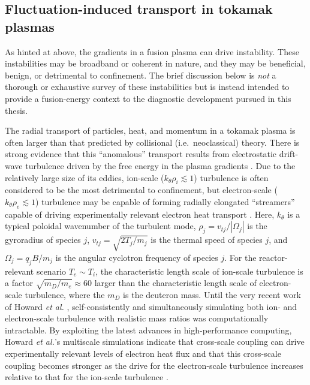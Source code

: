 \subsection{Fluctuation-induced transport in tokamak plasmas}
As hinted at above, the gradients in a fusion plasma can drive instability.
These instabilities may be broadband or coherent in nature, and
they may be beneficial, benign, or detrimental to confinement.
The brief discussion below is \emph{not}
a thorough or exhaustive survey of these instabilities but
is instead intended to provide a fusion-energy context
to the diagnostic development pursued in this thesis.

The radial transport of particles, heat, and momentum in a tokamak plasma is
often larger than that predicted by collisional (i.e.\ neoclassical) theory.
There is strong evidence that this ``anomalous'' transport
results from electrostatic drift-wave turbulence
driven by the free energy in the plasma gradients
\cite{horton_drift_waves,tynan_ppcf09}.
Due to the relatively large size of its eddies,
ion-scale ($k_{\theta} \rho_i \lesssim 1$) turbulence is often considered
to be the most detrimental to confinement, but
electron-scale ($k_{\theta} \rho_e \lesssim 1$) turbulence
may be capable of forming radially elongated ``streamers''
\cite{dorland_prl00}
capable of driving experimentally relevant electron heat transport
\cite{jenko_prl02}.
Here, $k_{\theta}$ is a typical poloidal wavenumber of the turbulent mode,
$\rho_j = v_{tj} / |\Omega_j|$ is the gyroradius of species $j$,
$v_{tj} = \sqrt{2 T_j / m_j}$ is the thermal speed of species $j$, and
$\Omega_j = q_j B / m_j$ is the angular cyclotron frequency of species $j$.
For the reactor-relevant scenario $T_e \sim T_i$,
the characteristic length scale of ion-scale turbulence is a factor
$\sqrt{m_D / m_e} \approx 60$ larger than
the characteristic length scale of electron-scale turbulence,
where the $m_D$ is the deuteron mass.
Until the very recent work of Howard \emph{et al.}
\cite{howard_pp14, howard_nf16, howard_pp16, holland_nf17, howard_ppcf18},
self-consistently and simultaneously simulating
both ion- and electron-scale turbulence with realistic mass ratios
was computationally intractable.
By exploiting the latest advances in high-performance computing,
Howard \emph{et al.}'s multiscale simulations indicate
that cross-scale coupling can drive
experimentally relevant levels of electron heat flux
\cite{howard_pp14, howard_ppcf18} and
that this cross-scale coupling becomes stronger
as the drive for the electron-scale turbulence increases
relative to that for the ion-scale turbulence
\cite{howard_nf16, howard_pp16}.

